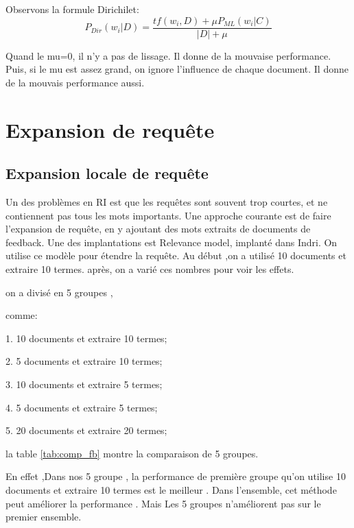 \documentclass[a4paper]{article}
\begin{document}
Observons la formule Dirichilet:
\begin{equation}
P_{Dir}(w_i|D)=\frac{tf(w_i,D)+\mu P_{ML}(w_i|C)}{|D|+\mu}
\end{equation}

Quand le mu=0, il n'y a pas de lissage. Il donne de la mouvaise performance. Puis, si le mu est assez grand, on ignore l'influence de chaque document. Il donne de la mouvais performance aussi.  












\section{Expansion de requête}
\subsection{Expansion locale de requête}
Un des problèmes en RI est que les requêtes sont souvent trop courtes, et ne contiennent
pas tous les mots importants. Une approche courante est de faire l’expansion de requête,
en y ajoutant des mots extraits de documents de feedback.
Une des implantations est Relevance model, implanté dans Indri. On  utilise ce modèle pour étendre la requête. 
Au début ,on a utilisé 10 documents et extraire
10 termes. après, on a varié ces nombres pour voir les effets.
 
  on a divisé en 5 groupes ,
 
  comme:
  
  1. 10 documents et extraire 10 termes;
  
  2. 5 documents et extraire 10 termes;
  
  3. 10 documents et extraire 5 termes;
 
  4. 5 documents et extraire 5 termes;
  
  5. 20 documents et extraire 20 termes;
  
 la table  \ref{tab:comp_fb} montre la comparaison de 5 groupes.
  
  En effet ,Dans nos 5 groupe , la performance de première groupe qu'on utilise 10 documents et extraire 10 termes est le meilleur . Dans l'ensemble, cet méthode peut améliorer la performance .  Mais Les 5 groupes n'améliorent pas sur le premier ensemble.
\end{document}
